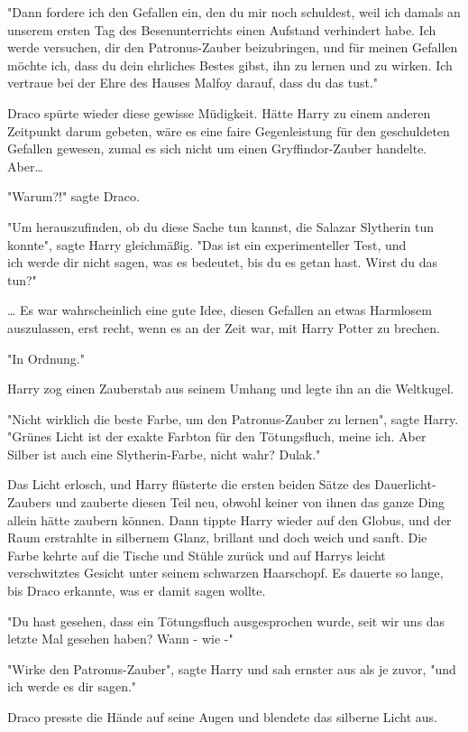 {"Dann fordere ich den Gefallen ein, den du mir noch schuldest, weil ich damals an unserem ersten Tag des Besenunterrichts einen Aufstand verhindert habe. Ich werde versuchen, dir den Patronus-Zauber beizubringen, und für meinen Gefallen möchte ich, dass du dein ehrliches Bestes gibst, ihn zu lernen und zu wirken. Ich vertraue bei der Ehre des Hauses Malfoy darauf, dass du das tust."

Draco spürte wieder diese gewisse Müdigkeit. Hätte Harry zu einem anderen Zeitpunkt darum gebeten, wäre es eine faire Gegenleistung für den geschuldeten Gefallen gewesen, zumal es sich nicht um einen Gryffindor-Zauber handelte. Aber…

"Warum?!" sagte Draco.

"Um herauszufinden, ob du diese Sache tun kannst, die Salazar Slytherin tun konnte", sagte Harry gleichmäßig. "Das ist ein experimenteller Test, und\\ ich werde dir nicht sagen, was es bedeutet, bis du es getan hast. Wirst du das tun?"

… Es war wahrscheinlich eine gute Idee, diesen Gefallen an etwas Harmlosem auszulassen, erst recht, wenn es an der Zeit war, mit Harry Potter zu brechen.

"In Ordnung."

Harry zog einen Zauberstab aus seinem Umhang und legte ihn an die Weltkugel.

"Nicht wirklich die beste Farbe, um den Patronus-Zauber zu lernen", sagte Harry. "Grünes Licht ist der exakte Farbton für den Tötungsfluch, meine ich. Aber Silber ist auch eine Slytherin-Farbe, nicht wahr? Dulak."

Das Licht erlosch, und Harry flüsterte die ersten beiden Sätze des Dauerlicht-Zaubers und zauberte diesen Teil neu, obwohl keiner von ihnen das ganze Ding allein hätte zaubern können. Dann tippte Harry wieder auf den Globus, und der Raum erstrahlte in silbernem Glanz, brillant und doch weich und sanft. Die Farbe kehrte auf die Tische und Stühle zurück und auf Harrys leicht verschwitztes Gesicht unter seinem schwarzen Haarschopf. Es dauerte so lange, bis Draco erkannte, was er damit sagen wollte.

"Du hast gesehen, dass ein Tötungsfluch ausgesprochen wurde, seit wir uns das letzte Mal gesehen haben? Wann - wie -"

"Wirke den Patronus-Zauber", sagte Harry und sah ernster aus als je zuvor, "und ich werde es dir sagen."

Draco presste die Hände auf seine Augen und blendete das silberne Licht aus.

}

